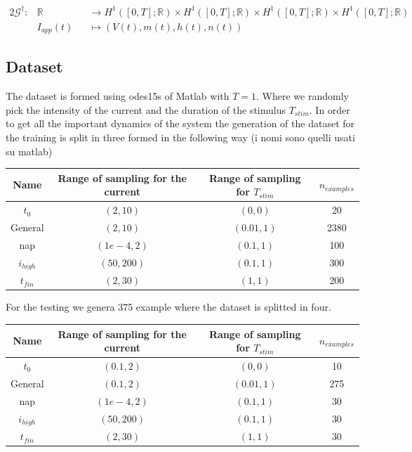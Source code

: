 \documentclass{article}
\newcommand{\Op}{\mathcal{G}^\dagger} %
\newcommand{\IR}{\mathbb{R}} %
\begin{document}
\begin{alignat*}{2}
    \Op : & \IR        &  & \rightarrow  H^1([0,T];\IR)\times H^1([0,T];\IR)\times H^1([0,T];\IR)\times H^1([0,T];\IR) \\
          & I_{app}(t) &  & \mapsto (V(t),m(t),h(t),n(t))
\end{alignat*}
\subsection{Dataset}
The dataset is formed using odes15s of Matlab with $T=1$. Where we randomly pick the intensity of the current and the duration of the stimulus $T_{stim}$. In order to get all the important dynamics of the system the generation of the dataset for the training is split in three formed in the following way (i nomi sono quelli usati su matlab)
\begin{center}
    \begin{tabular}{cccc}
        \hline
        Name       & Range of sampling for the current & Range of sampling for $T_{stim}$ & $n_{examples}$ \\
        \hline\hline
        $t_0$      & $(2,10)$                          & $(0,0)$                          & 20             \\
        General    & $(2,10)$                          & $(0.01,1)$                       & 2380           \\
        nap        & $(1e-4,2)$                        & $(0.1,1)$                        & 100            \\
        $i_{high}$ & $(50,200)$                        & $(0.1,1)$                        & 300            \\
        $t_{fin}$  & $(2,30)$                          & $(1,1)$                          & 200            \\
        \hline
    \end{tabular}
\end{center}
For the testing we genera 375 example where the dataset is splitted in four.
\begin{center}
    \begin{tabular}{cccc}
        \hline
        Name       & Range of sampling for the current & Range of sampling for $T_{stim}$ & $n_{examples}$ \\
        \hline\hline
        $t_0$      & $(0.1,2)$                         & $(0,0)$                          & 10             \\
        General    & $(0.1,2)$                         & $(0.01,1)$                       & 275            \\
        nap        & $(1e-4,2)$                        & $(0.1,1)$                        & 30             \\
        $i_{high}$ & $(50,200)$                        & $(0.1,1)$                        & 30             \\
        $t_{fin}$  & $(2,30)$                          & $(1,1)$                          & 30             \\
        \hline
    \end{tabular}
\end{center}
\end{document}
